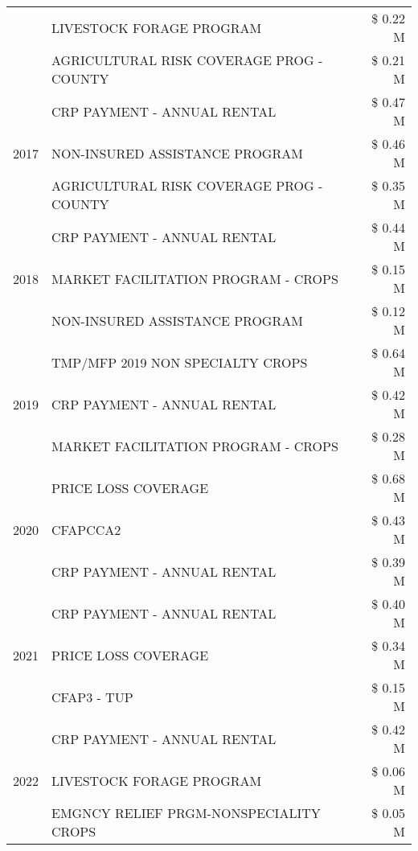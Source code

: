 \begin{tabular}{llr}
 & LIVESTOCK FORAGE PROGRAM & \$ 0.22 M \\
 & AGRICULTURAL RISK COVERAGE PROG - COUNTY & \$ 0.21 M \\
\cline{1-3}
\multirow[t]{3}{*}{2017} & CRP PAYMENT - ANNUAL RENTAL & \$ 0.47 M \\
 & NON-INSURED ASSISTANCE PROGRAM & \$ 0.46 M \\
 & AGRICULTURAL RISK COVERAGE PROG - COUNTY & \$ 0.35 M \\
\cline{1-3}
\multirow[t]{3}{*}{2018} & CRP PAYMENT - ANNUAL RENTAL & \$ 0.44 M \\
 & MARKET FACILITATION PROGRAM - CROPS & \$ 0.15 M \\
 & NON-INSURED ASSISTANCE PROGRAM & \$ 0.12 M \\
\cline{1-3}
\multirow[t]{3}{*}{2019} & TMP/MFP 2019 NON SPECIALTY CROPS & \$ 0.64 M \\
 & CRP PAYMENT - ANNUAL RENTAL & \$ 0.42 M \\
 & MARKET FACILITATION PROGRAM - CROPS & \$ 0.28 M \\
\cline{1-3}
\multirow[t]{3}{*}{2020} & PRICE LOSS COVERAGE & \$ 0.68 M \\
 & CFAPCCA2 & \$ 0.43 M \\
 & CRP PAYMENT - ANNUAL RENTAL & \$ 0.39 M \\
\cline{1-3}
\multirow[t]{3}{*}{2021} & CRP PAYMENT - ANNUAL RENTAL & \$ 0.40 M \\
 & PRICE LOSS COVERAGE & \$ 0.34 M \\
 & CFAP3 - TUP & \$ 0.15 M \\
\cline{1-3}
\multirow[t]{3}{*}{2022} & CRP PAYMENT - ANNUAL RENTAL & \$ 0.42 M \\
 & LIVESTOCK FORAGE PROGRAM & \$ 0.06 M \\
 & EMGNCY RELIEF PRGM-NONSPECIALITY CROPS & \$ 0.05 M \\
\cline{1-3}
\bottomrule
\end{tabular}
